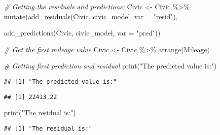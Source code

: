 \documentclass[
]{article}
\newenvironment{Shaded}{\begin{snugshade}}{\end{snugshade}}
\newcommand{\AttributeTok}[1]{\textcolor[rgb]{0.77,0.63,0.00}{#1}}
\newcommand{\CommentTok}[1]{\textcolor[rgb]{0.56,0.35,0.01}{\textit{#1}}}
\newcommand{\DecValTok}[1]{\textcolor[rgb]{0.00,0.00,0.81}{#1}}
\newcommand{\FunctionTok}[1]{\textcolor[rgb]{0.00,0.00,0.00}{#1}}
\newcommand{\NormalTok}[1]{#1}
\newcommand{\OtherTok}[1]{\textcolor[rgb]{0.56,0.35,0.01}{#1}}
\newcommand{\SpecialCharTok}[1]{\textcolor[rgb]{0.00,0.00,0.00}{#1}}
\newcommand{\StringTok}[1]{\textcolor[rgb]{0.31,0.60,0.02}{#1}}
\begin{document}
\begin{Shaded}
\begin{Highlighting}[]
\CommentTok{\# Getting the residuals and predictions:}
\NormalTok{Civic }\OtherTok{\textless{}{-}}\NormalTok{ Civic }\SpecialCharTok{\%\textgreater{}\%}
  \FunctionTok{mutate}\NormalTok{(}\FunctionTok{add\_residuals}\NormalTok{(Civic, civic\_model, }
                       \AttributeTok{var =} \StringTok{"resid"}\NormalTok{),}
         
         \FunctionTok{add\_predictions}\NormalTok{(Civic, civic\_model, }
                       \AttributeTok{var =} \StringTok{"pred"}\NormalTok{))}

\CommentTok{\# Get the first mileage value}
\NormalTok{Civic }\OtherTok{\textless{}{-}}\NormalTok{ Civic }\SpecialCharTok{\%\textgreater{}\%}
  \FunctionTok{arrange}\NormalTok{(Mileage)}

\CommentTok{\# Getting first prediction and residual}
\FunctionTok{print}\NormalTok{(}\StringTok{"The predicted value is:"}\NormalTok{)}
\end{Highlighting}
\end{Shaded}

\begin{verbatim}
## [1] "The predicted value is:"
\end{verbatim}

\begin{Shaded}
\end{Shaded}

\begin{verbatim}
## [1] 22413.22
\end{verbatim}

\begin{Shaded}
\begin{Highlighting}[]
\FunctionTok{print}\NormalTok{(}\StringTok{"The residual is:"}\NormalTok{)}
\end{Highlighting}
\end{Shaded}

\begin{verbatim}
## [1] "The residual is:"
\end{verbatim}

\begin{Shaded}
\end{Shaded}
\end{document}
